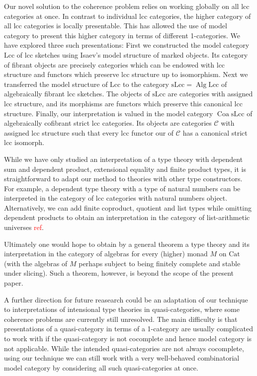 \documentclass[a4paper]{article}
\newcommand{\todo}[1]{\textcolor{red}{#1}}
\theoremstyle{remark}
\theoremstyle{definition}
\begin{document}
Our novel solution to the coherence problem relies on working globally on all lcc categories at once.
In contrast to individual lcc categories, the higher category of all lcc categories is locally presentable.
This has allowed the use of model category to present this higher category in terms of different 1-categories.
We have explored three such presentations:
First we constructed the model category $\mathrm{Lcc}$ of lcc sketches using Isaev's model structure of marked objects.
Its category of fibrant objects are precisely categories which can be endowed with lcc structure and functors which preserve lcc structure up to isomorphism.
Next we transferred the model structure of $\mathrm{Lcc}$ to the category $\mathrm{sLcc} = \operatorname{Alg} \mathrm{Lcc}$ of algebraically fibrant lcc sketches.
The objects of $\mathrm{sLcc}$ are categories with assigned lcc structure, and its morphisms are functors which preserve this canonical lcc structure.
Finally, our interpretation is valued in the model category $\operatorname{Coa} \mathrm{sLcc}$ of algebraically cofibrant strict lcc categories.
Its objects are categories $\mathcal{C}$ with assigned lcc structure such that every lcc functor our of $\mathcal{C}$ has a canonical strict lcc isomorph.

While we have only studied an interpretation of a type theory with dependent sum and dependent product, extensional equality and finite product types, it is straightforward to adapt our method to theories with other type constructors.
For example, a dependent type theory with a type of natural numbers can be interpreted in the category of lcc categories with natural numbers object.
Alternatively, we can add finite coproduct, quotient and list types while omitting dependent products to obtain an interpretation in the category of list-arithmetic universes \todo{ref}.

Ultimately one would hope to obtain by a general theorem a type theory and its interpretation in the category of algebras for every (higher) monad $M$ on $\mathrm{Cat}$ (with the algebras of $M$ perhaps subject to being finitely complete and stable under slicing).
Such a theorem, however, is beyond the scope of the present paper.

A further direction for future reasearch could be an adaptation of our technique to interpretations of intensional type theories in quasi-categories, where some coherence problems are currently still unresolved.
The main difficulty is that presentations of a quasi-category in terms of a 1-category are usually complicated to work with if the quasi-category is not cocomplete and hence model category is not applicable.
While the intended quasi-categories are not always cocomplete, using our technique we can still work with a very well-behaved combinatorial model category by considering all such quasi-categories at once.




\end{document}
